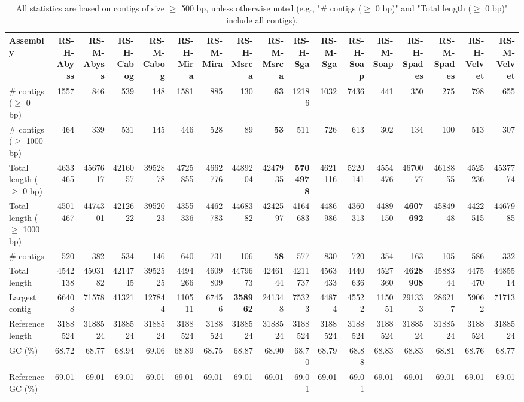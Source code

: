 \documentclass[12pt,a4paper]{article}
\begin{document}
\begin{table}[ht]
\begin{center}
\caption{All statistics are based on contigs of size $\geq$ 500 bp, unless otherwise noted (e.g., "\# contigs ($\geq$ 0 bp)" and "Total length ($\geq$ 0 bp)" include all contigs).}
\begin{tabular}{|l*{16}{|r}|}
\hline
Assembly & RS-H-Abyss & RS-M-Abyss & RS-H-Cabog & RS-M-Cabog & RS-H-Mira & RS-M-Mira & RS-H-Msrca & RS-M-Msrca & RS-H-Sga & RS-M-Sga & RS-H-Soap & RS-M-Soap & RS-H-Spades & RS-M-Spades & RS-H-Velvet & RS-M-Velvet \\ \hline
\# contigs ($\geq$ 0 bp) & 1557 & 846 & 539 & 148 & 1581 & 885 & 130 & {\bf 63} & 12186 & 1032 & 7436 & 441 & 350 & 275 & 798 & 655 \\ \hline
\# contigs ($\geq$ 1000 bp) & 464 & 339 & 531 & 145 & 446 & 528 & 89 & {\bf 53} & 511 & 726 & 613 & 302 & 134 & 100 & 513 & 307 \\ \hline
Total length ($\geq$ 0 bp) & 4633465 & 4567617 & 4216057 & 3952878 & 4725855 & 4662776 & 4489204 & 4247935 & {\bf 5704978} & 4621116 & 5220141 & 4554476 & 4670077 & 4618855 & 4525236 & 4537774 \\ \hline
Total length ($\geq$ 1000 bp) & 4501467 & 4474301 & 4212622 & 3952023 & 4355336 & 4462783 & 4468382 & 4242597 & 4164683 & 4486986 & 4360313 & 4489150 & {\bf 4607692} & 4584948 & 4422515 & 4467985 \\ \hline
\# contigs & 520 & 382 & 534 & 146 & 640 & 731 & 106 & {\bf 58} & 577 & 830 & 720 & 354 & 163 & 105 & 586 & 332 \\ \hline
Total length & 4542138 & 4503182 & 4214745 & 3952525 & 4494266 & 4609809 & 4479673 & 4246144 & 4211737 & 4563433 & 4440636 & 4527360 & {\bf 4628908} & 4588344 & 4475470 & 4485514 \\ \hline
Largest contig & 66408 & 71578 & 41321 & 127844 & 110511 & 67456 & {\bf 358962} & 241348 & 75323 & 44874 & 45522 & 115051 & 291333 & 286217 & 59062 & 71713 \\ \hline
Reference length & 3188524 & 3188524 & 3188524 & 3188524 & 3188524 & 3188524 & 3188524 & 3188524 & 3188524 & 3188524 & 3188524 & 3188524 & 3188524 & 3188524 & 3188524 & 3188524 \\ \hline
GC (\%) & 68.72 & 68.77 & 68.94 & 69.06 & 68.89 & 68.75 & 68.87 & 68.90 & 68.70 & 68.79 & 68.88 & 68.83 & 68.83 & 68.81 & 68.76 & 68.77 \\ \hline
Reference GC (\%) & 69.01 & 69.01 & 69.01 & 69.01 & 69.01 & 69.01 & 69.01 & 69.01 & 69.01 & 69.01 & 69.01 & 69.01 & 69.01 & 69.01 & 69.01 & 69.01 \\ \hline

\end{tabular}
\end{center}
\end{table}
\end{document}
